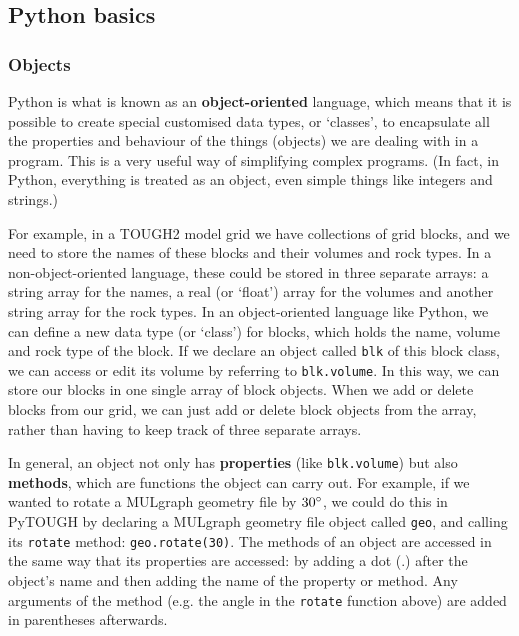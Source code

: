 \subsection{Python basics}

\subsubsection{Objects}

Python is what is known as an \textbf{object-oriented} language, which means that it is possible to create special customised data types, or `classes', to encapsulate all the properties and behaviour of the things (objects) we are dealing with in a program.  This is a very useful way of simplifying complex programs.  (In fact, in Python, everything is treated as an object, even simple things like integers and strings.)

For example, in a TOUGH2 model grid we have collections of grid blocks, and we need to store the names of these blocks and their volumes and rock types.  In a non-object-oriented language, these could be stored in three separate arrays: a string array for the names, a real (or `float') array for the volumes and another string array for the rock types.  In an object-oriented language like Python, we can define a new data type (or `class') for blocks, which holds the name, volume and rock type of the block.  If we declare an object called \texttt{blk} of this block class, we can access or edit its volume by referring to \texttt{blk.volume}.  In this way, we can store our blocks in one single array of block objects.  When we add or delete blocks from our grid, we can just add or delete block objects from the array, rather than having to keep track of three separate arrays.

In general, an object not only has \textbf{properties} (like \texttt{blk.volume}) but also \textbf{methods}, which are functions the object can carry out.  For example, if we wanted to rotate a MULgraph geometry file by $30\degree$, we could do this in PyTOUGH by declaring a MULgraph geometry file object called \texttt{geo}, and calling its \texttt{rotate} method: \texttt{geo.rotate(30)}.  The methods of an object are accessed in the same way that its properties are accessed: by adding a dot (.) after the object's name and then adding the name of the property or method.  Any arguments of the method (e.g. the angle in the \texttt{rotate} function above) are added in parentheses afterwards.

